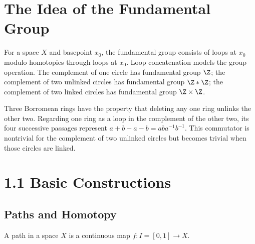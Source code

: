 
\section*{The Idea of the Fundamental Group}

For a space $X$ and basepoint $x_0$, the fundamental group consists of loops at
$x_0$ modulo homotopies through loops at $x_0$. Loop concatenation models the
group operation. The complement of one circle has fundamental group $\Z$; the
complement of two unlinked circles has fundamental group $\Z*\Z$; the
complement of two linked circles has fundamental group $\Z\times\Z$.

\begin{example}
\label{ex:borromean-rings-commutator}
Three Borromean rings have the property that deleting any one ring unlinks
the other two.  Regarding one ring as a loop in the complement of the other
two, its four successive passages represent
$a+b-a-b=aba^{-1}b^{-1}$.  This commutator is nontrivial for the complement
of two unlinked circles but becomes trivial when those circles are linked.
\end{example}

\section{1.1 Basic Constructions}
\label{sec:basic-constructions}

\subsection*{Paths and Homotopy}

\begin{definition}[Path]
\label{def:path}


A path in a space $X$ is a continuous map $f:I=[0,1]\to X$.
\end{definition}

